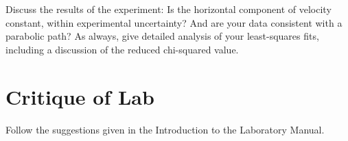 \begin{enumerate}
Discuss the results of the experiment:  Is the horizontal component of
velocity constant, within experimental uncertainty?  And are your data
consistent with a parabolic path?  As always, give detailed analysis
of your least-squares fits, including a discussion of the reduced
chi-squared value.

\section*{Critique of Lab}
     Follow the suggestions given in the Introduction to the
Laboratory Manual.




\end{enumerate}
\newpage
